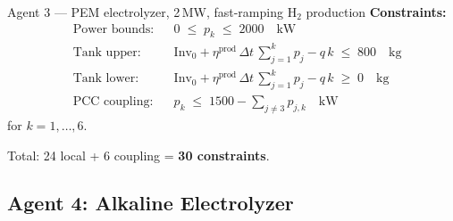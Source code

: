 \documentclass[11pt, letterpaper]{article}
\newcommand{\Dt}{\Delta t}
\begin{document}
\begin{agentbox}{Agent 3 — PEM electrolyzer, 2\,MW, fast-ramping H$_2$ production}
\textbf{Constraints:}
\begin{align*}
  &\text{Power bounds:}     && 0 \;\le\; p_k \;\le\; 2000 \quad\text{kW} \\
  &\text{Tank upper:}       && \text{Inv}_0 + \eta^{\text{prod}}\,\Dt\,\textstyle\sum_{j=1}^k p_j - q\,k \;\le\; 800 \quad\text{kg} \\
  &\text{Tank lower:}       && \text{Inv}_0 + \eta^{\text{prod}}\,\Dt\,\textstyle\sum_{j=1}^k p_j - q\,k \;\ge\; 0   \quad\text{kg} \\
  &\text{PCC coupling:}     && p_k \;\le\; 1500 - \textstyle\sum_{j\ne 3} p_{j,k} \quad\text{kW}
\end{align*}
for $k = 1,\ldots,6$.

Total: 24 local + 6 coupling = \textbf{30 constraints}.

\end{agentbox}

\subsection{Agent 4: Alkaline Electrolyzer}
\end{document}

